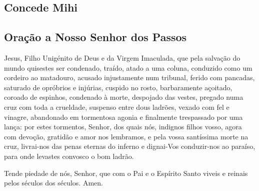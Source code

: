 \subsection{Concede Mihi}
\begin{paracol}{2}\switchcolumn{}\switchcolumn*{}\switchcolumn{}\switchcolumn*{}\switchcolumn{}\switchcolumn*{}\switchcolumn{}\end{paracol}

\subsection{Oração a Nosso Senhor dos Passos}
 Jesus, Filho Unigénito de Deus e da Virgem Imaculada, que pela salvação do mundo quisestes ser condenado, traído, atado a uma coluna, conduzido como um cordeiro ao matadouro, acusado injustamente num tribunal, ferido com pancadas, saturado de opróbrios e injúrias, cuspido no rosto, barbaramente açoitado, coroado de espinhos, condenado à morte, despojado das vestes, pregado numa cruz com toda a crueldade, suspenso entre dous ladrões, vexado com fel e vinagre, abandonado em tormentosa agonia e finalmente trespassado por uma lança: por estes tormentos, Senhor, dos quais nós, indignos filhos vosso, agora com devoção, gratidão e amor nos lembramos, e pela vossa santíssima morte na cruz, livrai-nos das penas eternas do inferno e dignai-Vos conduzir-nos ao paraíso, para onde levastes convosco o bom ladrão.\par
Tende piedade de nós, Senhor, que com o Pai e o Espírito Santo viveis e reinais pelos séculos dos séculos. Amen.

